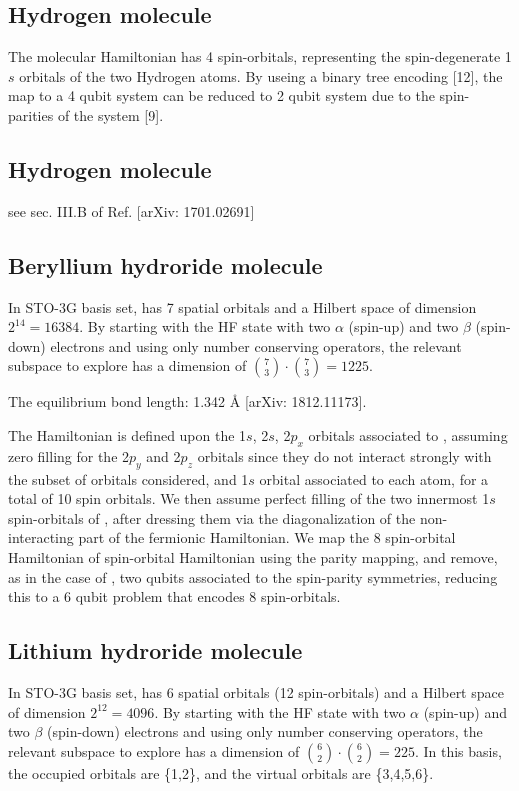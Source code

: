 \documentclass[11pt, oneside]{article}   	%
\begin{document}
\subsection{Hydrogen molecule}
The  molecular Hamiltonian has 4 spin-orbitals, representing the spin-degenerate 1$s$ orbitals of the two Hydrogen atoms. 
By useing a binary tree encoding [12], the map to a 4 qubit system can be reduced to 2 qubit system due to the spin-parities of the system [9]. 

\subsection{Hydrogen molecule}
 see sec. III.B of Ref. [arXiv: 1701.02691]

\subsection{Beryllium hydroride molecule}
In STO-3G basis set,  has 7 spatial orbitals and a Hilbert space of dimension $2^{14} = 16384$. 
By starting with the HF state with two $\alpha$ (spin-up) and two $\beta$ (spin-down) electrons and using only number conserving operators, the relevant subspace to explore has a dimension of 
$\binom{7}{3} \cdot \binom{7}{3} = 1225$. 

The equilibrium bond length: 1.342 \si{\angstrom} [arXiv: 1812.11173].

The  Hamiltonian is defined upon the 1$s$, 2$s$, 2$p_x$ orbitals associated to , assuming zero filling for the 2$p_y$ and 2$p_z$ orbitals since they do not interact strongly with the subset of orbitals considered, and 1$s$ orbital associated to each  atom, for a total of 10 spin orbitals. 
We then assume perfect filling of the two innermost 1$s$ spin-orbitals of , after dressing them via the diagonalization of the non-interacting part of the fermionic Hamiltonian. 
We map the 8 spin-orbital Hamiltonian of  spin-orbital Hamiltonian using the parity mapping, and remove, as in the case of , two qubits associated to the spin-parity symmetries, 
reducing this to a 6 qubit problem that encodes 8 spin-orbitals. 

\subsection{Lithium hydroride molecule}
In STO-3G basis set,  has 6 spatial orbitals (12 spin-orbitals) and a Hilbert space of dimension $2^{12} = 4096$. 
By starting with the HF state with two $\alpha$ (spin-up) and two $\beta$ (spin-down) electrons and using only number conserving operators, the relevant subspace to explore has a dimension of 
$\binom{6}{2} \cdot \binom{6}{2} = 225$. 
In this basis, the occupied orbitals are \{1,2\}, and the virtual orbitals are \{3,4,5,6\}.
\end{document}
